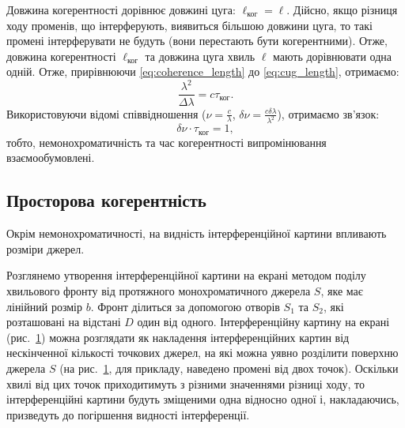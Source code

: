Довжина когерентності дорівнює довжині цуга: $\ell_\text{ког} = \ell$. Дійсно, якщо різниця ходу променів, що інтерферують,
виявиться більшою довжини цуга, то такі промені інтерферувати
не будуть (вони перестають бути когерентними). Отже, довжина
когерентності $ \ell_\text{ког} $ та довжина цуга хвиль $\ell $ мають дорівнювати одна одній. Отже, прирівнюючи \eqref{eq:coherence_length} до \eqref{eq:cug_length}, отримаємо:
\begin{equation*}
	\frac{\lambda^2}{\Delta\lambda}  = c\tau_\text{ког}.
\end{equation*}
Використовуючи відомі співвідношення ($\nu = \frac{c}{\lambda}$, $\delta\nu = \frac{c\delta\lambda}{\lambda^2}$), отримаємо зв'язок:
\begin{equation*}
	\delta\nu\cdot\tau_\text{ког} = 1,
\end{equation*}
тобто, немонохроматичність та час когерентності
випромінювання взаємообумовлені.




\subsection*{Просторова когерентність}



Окрім немонохроматичності, на видність інтерференційної картини впливають розміри джерел.

Розглянемо утворення інтерференційної картини на екрані методом поділу хвильового фронту від протяжного монохроматичного джерела $ S $, яке має лінійний розмір $ b $. Фронт ділиться за допомогою отворів $ S_1 $ та $ S_2 $, які розташовані на відстані $ D $ один від одного. Інтерференційну картину на екрані (рис.~\ref{pic:space_coherence}) можна розглядати як накладення інтерференційних картин від нескінченної кількості  точкових джерел, на які можна уявно розділити поверхню джерела $ S $ (на рис.~\ref{pic:space_coherence}, для прикладу, наведено промені від двох  точок). Оскільки хвилі від цих точок приходитимуть з різними значеннями різниці ходу, то інтерференційні картини будуть зміщеними одна відносно одної і, накладаючись, призведуть до погіршення видності інтерференції.

\begin{figure}[h!]\centering
    
	\caption{}
    \label{pic:space_coherence}
\end{figure}


